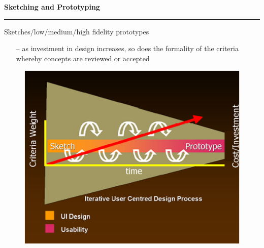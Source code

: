 \documentclass[pdf]{beamer}
\begin{document}
\begin{frame}
\vspace{8mm}
\textcolor{myBlue}{\textbf{\Large{Sketching and Prototyping}}}

\textcolor{red}{\rule{10cm}{1mm}}

\bigskip

{\LARGE Sketches/low/medium/high fidelity prototypes \LARGE}

\begin{itemize}
    \item[\textcolor{black}{--}] as investment in design increases, so does the formality of the criteria whereby concepts are reviewed or accepted
\end{itemize}

\begin{figure}[b]
    	\includegraphics[scale = 0.5]{11.PNG}
\end{figure}
\end{frame}
\end{document}
